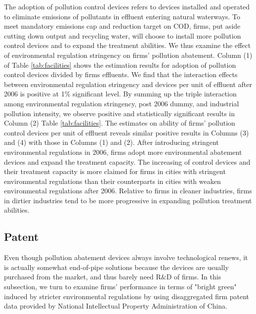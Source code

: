 \documentclass[12pt,english]{article}
\begin{document}
The adoption of pollution control devices refers to devices installed and operated to eliminate emissions of pollutants in effluent entering natural waterways. To meet mandatory emissions cap and reduction target on COD, firms, put aside cutting down output and recycling water, will choose to install more pollution control devices and to expand the treatment abilities. We thus examine the effect of environmental regulation stringency on firms' pollution abatement. Column (1) of Table \ref{tab:facilities} shows the estimation results for adoption of pollution control devices divided by firms effluents. We find that the interaction effects between environmental regulation stringency and devices per unit of effluent after 2006 is positive at 1$\%$ significant level. By summing up the triple interaction among environmental regulation stringency, post 2006 dummy, and industrial pollution intensity, we observe positive and statistically significant results in Column (2) Table \ref{tab:facilities}. The estimates on ability of firms' pollution control devices per unit of effluent reveals similar positive results in Columns (3) and (4) with those in Columns (1) and (2). After introducing stringent environmental regulations in 2006, firms adopt more environmental abatement devices and expand the treatment capacity. The increasing of control devices and their treatment capacity is more claimed for firms in cities with stringent environmental regulations than their counterparts in cities with weaken environmental regulations after 2006. Relative to firms in cleaner industries, firms in dirtier industries tend to be more progressive in expanding pollution treatment abilities.

 

\subsection{Patent}

Even though pollution abatement devices always involve technological renews, it is actually somewhat end-of-pipe solutions because the devices are usually purchased from the market, and thus barely need R$\&$D of firms. In this subsection, we turn to examine firms’ performance in terms of "bright green" induced by stricter environmental regulations by using disaggregated firm patent data provided by National Intellectual Property Administration of China.
\end{document}
